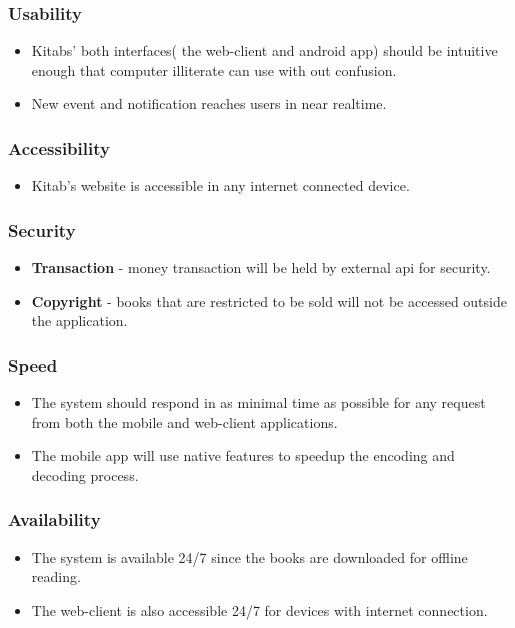 	\subsubsection{Usability}
	\begin{itemize}
		\item Kitabs' both interfaces( the web-client and android app) should be intuitive enough that computer illiterate can use with out confusion.
		\item New event and notification reaches users in near realtime.
	\end{itemize}

	\subsubsection{Accessibility}
	\begin{itemize}
		\item Kitab's website is accessible in any internet connected device.
	\end{itemize}

	\subsubsection{Security}
	\begin{itemize}
		\item \textbf{Transaction} - money transaction will be held by external api for security.
		\item \textbf{Copyright} - books that are restricted to be sold will not be accessed outside the application.
	\end{itemize}

	\subsubsection{Speed}
	\begin{itemize}
		\item The system should respond in as minimal time as possible for any request from both the mobile and web-client applications.
      \item The mobile app will use native features to speedup the encoding and decoding process.
   \end{itemize}

	\subsubsection{Availability}
	\begin{itemize}
		\item The system is available 24/7 since the books are downloaded for offline reading.
		\item The web-client is also accessible 24/7 for devices with internet connection.
	\end{itemize}

